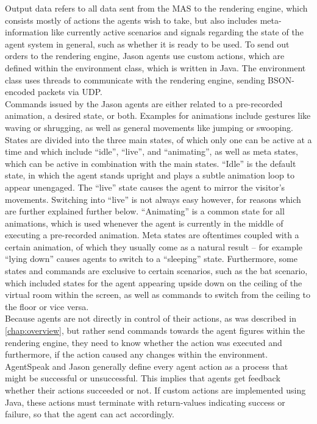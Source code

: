 \documentclass[draft,final]{vutinfth} %
\begin{document}
Output data refers to all data sent from the MAS to the rendering engine, which consists mostly of actions the agents wish to take, but also includes meta-information like currently active scenarios and signals regarding the state of the agent system in general, such as whether it is ready to be used. 
To send out orders to the rendering engine, Jason agents use custom actions, which are defined within the environment class, which is written in Java. 
The environment class uses threads to communicate with the rendering engine, sending BSON-encoded packets via UDP. \\
Commands issued by the Jason agents are either related to a pre-recorded animation, a desired state, or both. 
Examples for animations include gestures like waving or shrugging, as well as general movements like jumping or swooping. 
States are divided into the three main states, of which only one can be active at a time and which include “idle”, “live”, and “animating”, as well as meta states, which can be active in combination with the main states.
“Idle” is the default state, in which the agent stands upright and plays a subtle animation loop to appear unengaged. 
The “live” state causes the agent to mirror the visitor’s movements. 
Switching into “live” is not always easy however, for reasons which are further explained further below. 
“Animating” is a common state for all animations, which is used whenever the agent is currently in the middle of executing a pre-recorded animation. 
Meta states are oftentimes coupled with a certain animation, of which they usually come as a natural result – for example “lying down” causes agents to switch to a “sleeping” state. 
Furthermore, some states and commands are exclusive to certain scenarios, such as the bat scenario, which included states for the agent appearing upside down on the ceiling of the virtual room within the screen, as well as commands to switch from the ceiling to the floor or vice versa.\\
Because agents are not directly in control of their actions, as was described in \autoref{chap:overview}, but rather send commands towards the agent figures within the rendering engine, they need to know whether the action was executed and furthermore, if the action caused any changes within the environment. 
AgentSpeak and Jason generally define every agent action as a process that might be successful or unsuccessful. 
This implies that agents get feedback whether their actions succeeded or not. 
If custom actions are implemented using Java, these actions must terminate with return-values indicating success or failure, so that the agent can act accordingly. 
\end{document}
